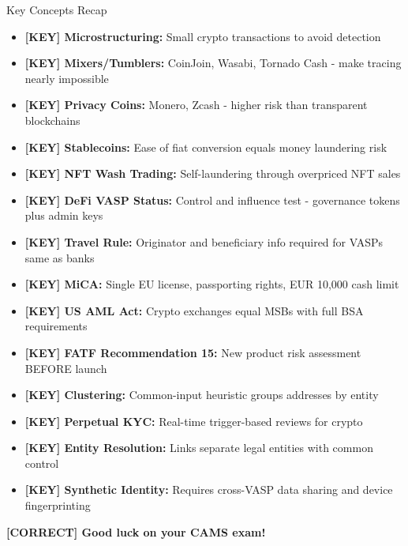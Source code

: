\documentclass[11pt,a4paper]{beamer}
\newcommand{\greennote}[1]{\textcolor{green!50!black}{\textbf{[CORRECT] #1}}}
\newcommand{\keyterm}[1]{\textcolor{red!80!black}{\textbf{[KEY] #1}}}
\begin{document}
\begin{frame}{Key Concepts Recap}
\small
\begin{itemize}
    \item \keyterm{Microstructuring:} Small crypto transactions to avoid detection
    \item \keyterm{Mixers/Tumblers:} CoinJoin, Wasabi, Tornado Cash - make tracing nearly impossible
    \item \keyterm{Privacy Coins:} Monero, Zcash - higher risk than transparent blockchains
    \item \keyterm{Stablecoins:} Ease of fiat conversion equals money laundering risk
    \item \keyterm{NFT Wash Trading:} Self-laundering through overpriced NFT sales
    \item \keyterm{DeFi VASP Status:} Control and influence test - governance tokens plus admin keys
    \item \keyterm{Travel Rule:} Originator and beneficiary info required for VASPs same as banks
    \item \keyterm{MiCA:} Single EU license, passporting rights, EUR 10,000 cash limit
    \item \keyterm{US AML Act:} Crypto exchanges equal MSBs with full BSA requirements
    \item \keyterm{FATF Recommendation 15:} New product risk assessment BEFORE launch
    \item \keyterm{Clustering:} Common-input heuristic groups addresses by entity
    \item \keyterm{Perpetual KYC:} Real-time trigger-based reviews for crypto
    \item \keyterm{Entity Resolution:} Links separate legal entities with common control
    \item \keyterm{Synthetic Identity:} Requires cross-VASP data sharing and device fingerprinting
\end{itemize}
\vspace{0.3cm}
\centering
\greennote{Good luck on your CAMS exam!}
\end{frame}
\end{document}
